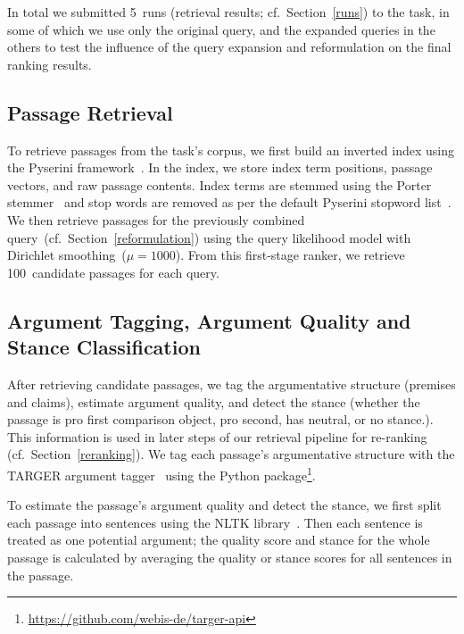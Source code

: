 In total we submitted 5~runs (retrieval results;  cf.\ Section~\ref{runs}) to the task, in some of which we use only the original query, and the expanded queries in the others to test the influence of the query expansion and reformulation on the final ranking results.

\subsection{Passage Retrieval}\label{retrieval}

To retrieve passages from the task's corpus, we first build an inverted index using the Pyserini framework~\cite{LinMLYPN2021}.
In the index, we store index term positions, passage vectors, and raw passage contents.
Index terms are stemmed using the Porter stemmer~\cite{Porter1980} and stop words are removed as per the default Pyserini stopword list~\cite{LinMLYPN2021}.
We then retrieve passages for the previously combined query~(cf.\ Section~\ref{reformulation}) using the query likelihood model with Dirichlet smoothing~(\( \mu = 1000 \)).
From this first-stage ranker, we retrieve 100~candidate passages for each query.

\subsection{Argument Tagging, Argument Quality and Stance Classification}
\label{argument-tagging}

After retrieving candidate passages, we tag the argumentative structure (premises and claims), estimate argument quality, and detect the stance (whether the passage is pro first comparison object, pro second, has neutral, or no stance.).
This information is used in later steps of our retrieval pipeline for re-ranking (cf.\ Section~\ref{reranking}).
We tag each passage's argumentative structure with the TARGER argument tagger~\cite{ChernodubOHBHBP2019} using the  Python package\footnote{\url{https://github.com/webis-de/targer-api}}.

To estimate the passage's argument quality and detect the stance, we first split each passage into sentences using the NLTK library~\cite{BirdLK2009}.
Then each sentence is treated as one potential argument; the quality score and stance for the whole passage is calculated by averaging the quality or stance scores for all sentences in the passage.

